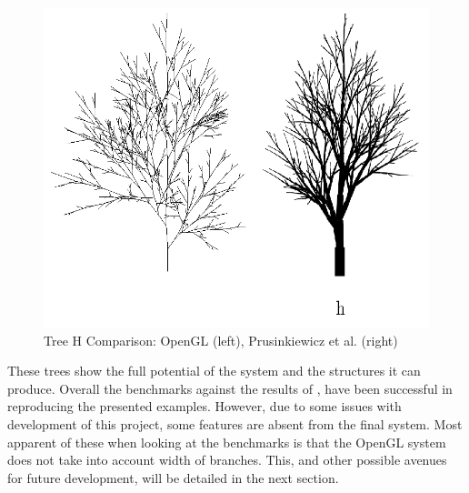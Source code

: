 \documentclass[final]{cmpreport}
\begin{document}
\begin{figure}[ht]
    \includegraphics[scale=0.4]{tree-comp-h.png} 
    \centering
    \captionsetup{justification=centering}
    \caption{Tree H Comparison: OpenGL (left), Prusinkiewicz et al. (right)}
    \label{fig:tree-comp-h}
\end{figure}

These trees show the full potential of the system and the structures it can produce. Overall the 
benchmarks against the results of \cite{prusinkiewicz1996systems}, have been successful in 
reproducing the presented examples. However, due to some issues with development of this project, 
some features are absent from the final system. Most apparent of these when looking at the benchmarks 
is that the OpenGL system does not take into account width of branches. This, and other possible 
avenues for future development, will be detailed in the next section. 
\end{document}
